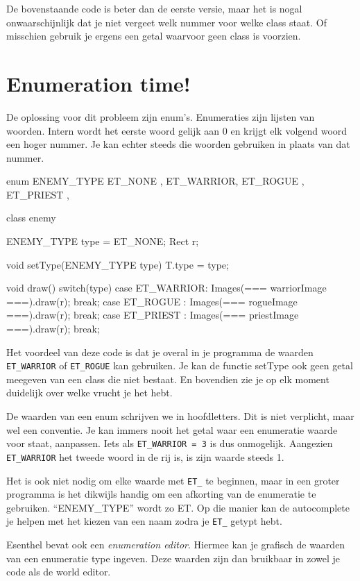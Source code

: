 De bovenstaande code is beter dan de eerste versie, maar het is nogal onwaarschijnlijk dat je niet vergeet welk nummer voor welke class staat. Of misschien gebruik je ergens een getal waarvoor geen class is voorzien. 

\section{Enumeration time!}
De oplossing voor dit probleem zijn enum's. Enumeraties zijn lijsten van woorden. Intern wordt het eerste woord gelijk aan 0 en krijgt elk volgend woord een hoger nummer. Je kan echter steeds die woorden gebruiken in plaats van dat nummer. 

\begin{code}
enum ENEMY_TYPE {
	ET_NONE   ,
  ET_WARRIOR,
  ET_ROGUE  ,
	ET_PRIEST , 
}

class enemy {
  ENEMY_TYPE type = ET_NONE;
	Rect r;
	
	void setType(ENEMY_TYPE type) {
		T.type = type;
	}
	
	void draw() {
		switch(type) {
			case ET_WARRIOR: Images(=== warriorImage ===).draw(r); break;
			case ET_ROGUE  : Images(=== rogueImage   ===).draw(r); break;
			case ET_PRIEST : Images(=== priestImage  ===).draw(r); break;
		}
	}
}
\end{code}

Het voordeel van deze code is dat je overal in je programma de waarden \texttt{ET\_WARRIOR} of \texttt{ET\_ROGUE} kan gebruiken. Je kan de functie setType ook geen getal meegeven van een class die niet bestaat. En bovendien zie je op elk moment duidelijk over welke vrucht je het hebt. 

De waarden van een enum schrijven we in hoofdletters. Dit is niet verplicht, maar wel een conventie. Je kan immers nooit het getal waar een enumeratie waarde voor staat, aanpassen. Iets als \texttt{ET\_WARRIOR = 3} is dus onmogelijk. Aangezien \texttt{ET\_WARRIOR} het tweede woord in de rij is, is zijn waarde steeds 1.

Het is ook niet nodig om elke waarde met \texttt{ET\_} te beginnen, maar in een groter programma is het dikwijls handig om een afkorting van de enumeratie te gebruiken. ``ENEMY\_TYPE'' wordt zo ET. Op die manier kan de autocomplete je helpen met het kiezen van een naam zodra je \texttt{ET\_} getypt hebt.

\begin{note}
Esenthel bevat ook een \textsl{enumeration editor}. Hiermee kan je grafisch de waarden van een enumeratie type ingeven. Deze waarden zijn dan bruikbaar in zowel je code als de world editor.
\end{note}

